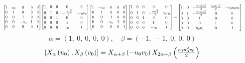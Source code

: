 \documentclass[11pt]{article}
\theoremstyle{definition}
\begin{document}
\[
\scaletoalign{\textwidth}{{\left[\begin{matrix}1 & u_{0} & 0 & 0 & 0\\0 & 1 & 0 & 0 & 0\\0 & 0 & 1 & 0 & 0\\0 & 0 & - u_{0} & 1 & 0\\0 & 0 & 0 & 0 & 1\end{matrix}\right]} {\left[\begin{matrix}1 & 0 & 0 & 0 & 0\\0 & 1 & 0 & - \frac{c_{0} v_{0}^{2}}{2} & - c_{0} v_{0}\\0 & 0 & 1 & 0 & 0\\0 & 0 & 0 & 1 & 0\\0 & 0 & 0 & v_{0} & 1\end{matrix}\right]} {\left[\begin{matrix}1 & - u_{0} & 0 & 0 & 0\\0 & 1 & 0 & 0 & 0\\0 & 0 & 1 & 0 & 0\\0 & 0 & u_{0} & 1 & 0\\0 & 0 & 0 & 0 & 1\end{matrix}\right]} {\left[\begin{matrix}1 & 0 & 0 & 0 & 0\\0 & 1 & 0 & - \frac{c_{0} v_{0}^{2}}{2} & c_{0} v_{0}\\0 & 0 & 1 & 0 & 0\\0 & 0 & 0 & 1 & 0\\0 & 0 & 0 & - v_{0} & 1\end{matrix}\right]} = {\left[\begin{matrix}1 & 0 & - \frac{c_{0} u_{0}^{2} v_{0}^{2}}{2} & \frac{c_{0} u_{0} v_{0}^{2}}{2} & - c_{0} u_{0} v_{0}\\0 & 1 & - \frac{c_{0} u_{0} v_{0}^{2}}{2} & 0 & 0\\0 & 0 & 1 & 0 & 0\\0 & 0 & 0 & 1 & 0\\0 & 0 & u_{0} v_{0} & 0 & 1\end{matrix}\right]}}
\]
\[
\alpha = \left( 1, \  0, \  0, \  0, \  0\right), \quad \beta = \left( -1, \  -1, \  0, \  0, \  0\right)
\]
\[
\scaletoalign{\textwidth}{\left[ X_{\alpha}\left(u_{0}\right), X_{\beta}\left(v_{0}\right) \right] = X_{\alpha + \beta}\left(- u_{0} v_{0}\right) X_{2\alpha + \beta}\left(\frac{c_{0} u_{0}^{2} v_{0}}{2}\right)}
\]
\end{document}
